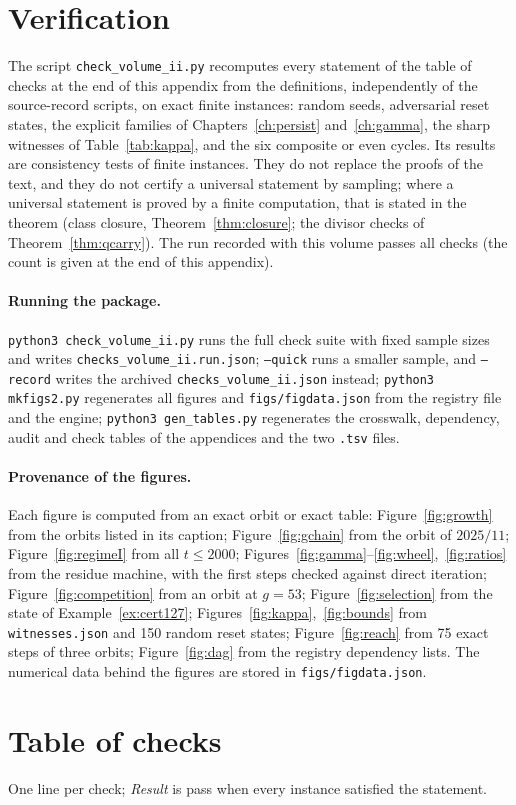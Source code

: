 \section{Verification}

The script \texttt{check\_volume\_ii.py} recomputes every statement of the table of checks at the end of this appendix from the definitions, independently of the source-record scripts, on exact finite instances: random seeds, adversarial reset states, the explicit families of Chapters~\ref{ch:persist} and~\ref{ch:gamma}, the sharp witnesses of Table~\ref{tab:kappa}, and the six composite or even cycles. Its results are consistency tests of finite instances. They do not replace the proofs of the text, and they do not certify a universal statement by sampling; where a universal statement is proved by a finite computation, that is stated in the theorem (class closure, Theorem~\ref{thm:closure}; the divisor checks of Theorem~\ref{thm:qcarry}). The run recorded with this volume passes all checks (the count is given at the end of this appendix).

\paragraph{Running the package.}
\texttt{python3 check\_volume\_ii.py} runs the full check suite with fixed sample sizes and writes \texttt{checks\_volume\_ii.run.json}; \texttt{--quick} runs a smaller sample, and \texttt{--record} writes the archived \texttt{checks\_volume\_ii.json} instead; \texttt{python3 mkfigs2.py} regenerates all figures and \texttt{figs/figdata.json} from the registry file and the engine; \texttt{python3 gen\_tables.py} regenerates the crosswalk, dependency, audit and check tables of the appendices and the two \texttt{.tsv} files.

\paragraph{Provenance of the figures.} Each figure is computed from an exact orbit or exact table: Figure~\ref{fig:growth} from the orbits listed in its caption; Figure~\ref{fig:gchain} from the orbit of \(2025/11\); Figure~\ref{fig:regimeI} from all \(t\le2000\); Figures~\ref{fig:gamma}--\ref{fig:wheel},~\ref{fig:ratios} from the residue machine, with the first steps checked against direct iteration; Figure~\ref{fig:competition} from an orbit at \(g=53\); Figure~\ref{fig:selection} from the state of Example~\ref{ex:cert127}; Figures~\ref{fig:kappa},~\ref{fig:bounds} from \texttt{witnesses.json} and 150 random reset states; Figure~\ref{fig:reach} from 75 exact steps of three orbits; Figure~\ref{fig:dag} from the registry dependency lists. The numerical data behind the figures are stored in \texttt{figs/figdata.json}.

\section*{Table of checks}

One line per check; \emph{Result} is \textsf{pass} when every instance satisfied the statement.


